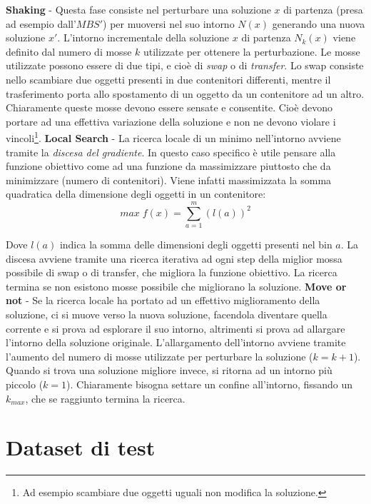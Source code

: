 \documentclass{article}
\begin{document}
\textbf{Shaking} - Questa fase consiste nel perturbare una soluzione $x$ di partenza (presa ad esempio dall'$MBS'$) per muoversi nel suo intorno $N(x)$ generando una nuova soluzione $x'$. L'intorno incrementale della soluzione $x$ di partenza $N_{k}(x)$ viene definito dal numero di mosse $k$ utilizzate per ottenere la perturbazione. 
\newline
\newline
Le mosse utilizzate possono essere di due tipi, e cioè di \textit{swap} o di \textit{transfer}. Lo swap consiste nello scambiare due oggetti presenti in due contenitori differenti, mentre il trasferimento porta allo spostamento di un oggetto da un contenitore ad un altro. Chiaramente queste mosse devono essere sensate e consentite. Cioè devono portare ad una effettiva variazione della soluzione e non ne devono violare i vincoli\footnote{Ad esempio scambiare due oggetti uguali non modifica la soluzione.}. 
\newline
\newline
\textbf{Local Search} - La ricerca locale di un minimo nell'intorno avviene tramite la \textit{discesa del gradiente}. In questo caso specifico è utile pensare alla funzione obiettivo come ad una funzione da massimizzare piuttosto che da minimizzare (numero di contenitori). Viene infatti massimizzata la somma quadratica della dimensione degli oggetti in un contenitore:
\[
max\;f(x) = \sum_{a=1}^{m} (l(a))^2
\]

Dove $l(a)$ indica la somma delle dimensioni degli oggetti presenti nel bin $a$.
La discesa avviene tramite una ricerca iterativa ad ogni step della miglior mossa possibile di swap o di transfer, che migliora la funzione obiettivo. La ricerca termina se non esistono mosse possibile che migliorano la soluzione.
\newline
\newline
\textbf{Move or not} - Se la ricerca locale ha portato ad un effettivo miglioramento della soluzione, ci si muove verso la nuova soluzione, facendola diventare quella corrente e si prova ad esplorare il suo intorno, altrimenti si prova ad allargare l'intorno della soluzione originale. L'allargamento dell'intorno avviene tramite l'aumento del numero di mosse utilizzate per perturbare la soluzione ($k=k+1$). Quando si trova una soluzione migliore invece, si ritorna ad un intorno più piccolo ($k=1$). Chiaramente bisogna settare un confine all'intorno, fissando un $k_{max}$, che se raggiunto termina la ricerca.

\section{Dataset di test}
\end{document}
